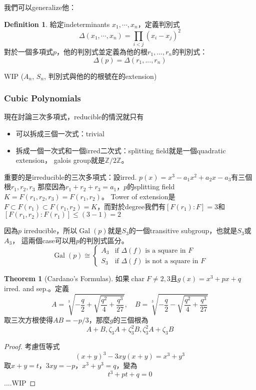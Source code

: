 \documentclass[12pt]{article}
\theoremstyle{definition}
\newtheorem{thm}{Theorem}
\newtheorem{dfn}{Definition}
\newcommand{\ZZ}{\mathbb Z}
\newcommand{\cbrt}[1]{\sqrt[3]{#1}}
\DeclareMathOperator{\Char}{char}
\DeclareMathOperator{\Gal}{Gal}
\begin{document}
我們可以generalize他：

\begin{dfn}
	給定indeterminants $x_1,\cdots,x_n$，定義判別式
	\[
		\Delta(x_1,\cdots,x_n)=\prod_{i<j}(x_i-x_j)^2
	\]
	對於一個多項式$p$，他的判別式並定義為他的根$r_1,...,r_n$的判別式：
	\[
		\Delta(p)=\Delta(r_1,...,r_n)
	\]
\end{dfn}

WIP ($A_n$, $S_n$, 判別式與他的的根號在的extension)

\subsubsection{Cubic Polynomials}

現在討論三次多項式，reducible的情況就只有
\begin{itemize}
	\item 可以拆成三個一次式：trivial
	\item 拆成一個一次式和一個irred二次式：splitting field就是一個quadratic extension，
	      galois group就是$\ZZ/2\ZZ$。
\end{itemize}
重要的是irreducible的三次多項式：設irred. $p(x)=x^3-a_1 x^2+a_2 x-a_3$有三個根$r_1,r_2,r_3$
那麼因為$r_1+r_2+r_3=a_1$，$p$的splitting field $K=F(r_1,r_2,r_3)=F(r_1,r_2)$。
Tower of extension是$F\subset F(r_1) \subset F(r_1,r_2)=K$，而對於degree我們有$[F(r_1):F]=3$和$[F(r_1,r_2):F(r_1)]\le (3-1)=2$

因為$p$ irreducible，所以$\Gal(p)$就是$S_3$的一個transitive subgroup，也就是$S_3$或$A_3$，
這兩個case可以用$p$的判別式區分。
\[
	\Gal(p) \cong
	\begin{cases}
		A_3 & \text{if } \Delta(f) \text{ is a square in }F     \\
		S_3 & \text{if } \Delta(f) \text{ is not a square in }F
	\end{cases}
\]

\begin{thm}[Cardano's Formulas]
	如果$\Char{F}\neq 2,3$且$g(x)=x^3+px+q$ irred. and sep.。定義
	\[
		A=\cbrt{-\frac{q}{2} + \sqrt{\frac{q^2}{4} + \frac{q^3}{27}}},\quad
		B=\cbrt{-\frac{q}{2} - \sqrt{\frac{q^2}{4} + \frac{q^3}{27}}}
	\]
	取三次方根使得$AB=-p/3$，那麼$g$的三個根為
	\[
		A+B, \zeta_3 A+\zeta_3^2 B, \zeta_3^2 A+\zeta_3 B
	\]
\end{thm}

\begin{proof}
	考慮恆等式
	\[(x+y)^3-3xy(x+y)=x^3+y^3\]
	取$x+y=t$，$3xy=-p$，$x^3+y^3=q$，變為
	\[t^3+pt+q=0\]
	....WIP
\end{proof}
\end{document}
